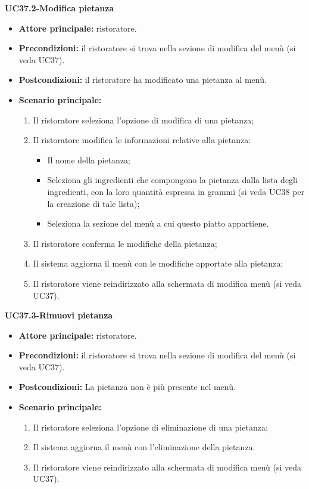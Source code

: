 \textbf{UC37.2-Modifica pietanza}  
\begin{itemize}
    \item \textbf{Attore principale:} ristoratore.
    \item \textbf{Precondizioni:} il ristoratore si trova nella sezione di modifica del menù (si veda UC37).
    \item \textbf{Postcondizioni:} il ristoratore ha modificato una pietanza al menù.
    \item \textbf{Scenario principale:}
    \begin{enumerate}
        \item Il ristoratore seleziona l'opzione di modifica di una pietanza;
        \item Il ristoratore modifica le informazioni relative alla pietanza:
        \begin{itemize}
            \item Il nome della pietanza;
            \item Seleziona gli ingredienti che compongono la pietanza dalla lista degli ingredienti, con la loro quantità espressa in grammi (si veda UC38 per la creazione di tale lista);
            \item Seleziona la sezione del menù a cui questo piatto appartiene.
        \end{itemize}
        \item Il ristoratore conferma le modifiche della pietanza;
        \item Il sistema aggiorna il menù con le modifiche apportate alla pietanza;
        \item Il ristoratore viene reindirizzato alla schermata di modifica menù (si veda UC37).
    \end{enumerate}
\end{itemize}

\textbf{UC37.3-Rimuovi pietanza}  
\begin{itemize}
    \item \textbf{Attore principale:} ristoratore.
    \item \textbf{Precondizioni:} il ristoratore si trova nella sezione di modifica del menù (si veda UC37).
    \item \textbf{Postcondizioni:} La pietanza non è più presente nel menù.
    \item \textbf{Scenario principale:}
    \begin{enumerate}
        \item Il ristoratore seleziona l'opzione di eliminazione di una pietanza;
        \item Il sistema aggiorna il menù con l'eliminazione della pietanza.
        \item Il ristoratore viene reindirizzato alla schermata di modifica menù (si veda UC37).
    \end{enumerate}
\end{itemize}


